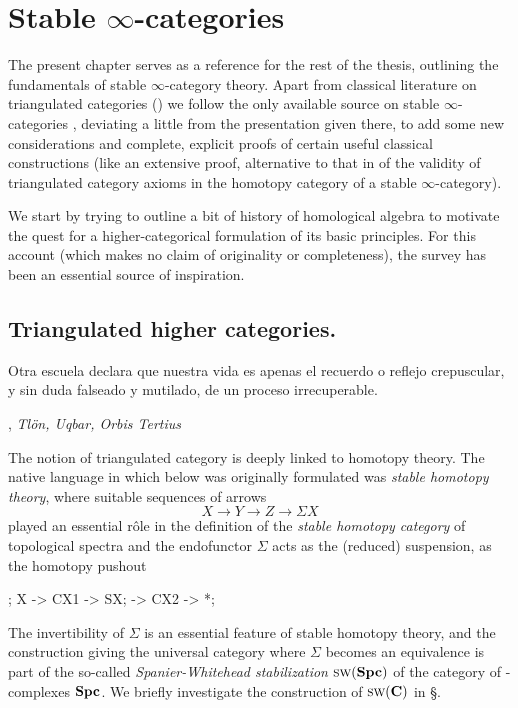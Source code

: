 \chapter{Stable $\infty$\hyp{}categories}\label{chap:stable.cats}
\thispagestyle{empty}
The present chapter serves as a reference for the rest of the thesis, outlining the fundamentals of stable $\infty$\hyp{}category theory. Apart from classical literature on triangulated categories (\cite{Hol,Nee}) we follow the only available source on stable $\infty$\hyp{}categories \cite{LurieHA}, deviating a little from the presentation given there, to add some new considerations and complete, explicit proofs of certain useful classical constructions (like an extensive proof, alternative to that in \cite{LurieHA} of the validity of triangulated category axioms in the homotopy category of a stable $\infty$\hyp{}category).

We start by trying to outline a bit of history of homological algebra to motivate the quest for a higher\hyp{}categorical formulation of its basic principles. For this account (which makes no claim of originality or completeness), the survey \cite{Weibel1997history} has been an essential source of inspiration.
\section{Triangulated higher categories.}
\setlength{\epigraphwidth}{.7\textwidth}
\epigraph{Otra escuela declara \omissis que nuestra vida es apenas el recuerdo o reflejo crepuscular, y sin duda falseado y mutilado, de un proceso irrecuperable.}{\cite{Borges1963}, \emph{Tl\"on, Uqbar, Orbis Tertius}}
\setlength{\epigraphwidth}{\DefaultEpigraphWidth}
The notion of triangulated category is deeply linked to homotopy theory. The native language in which \adef {} below was originally formulated was \emph{stable homotopy theory}, where suitable sequences of arrows
\[\label{dt}
X \to Y\to Z\to \Sigma X
\]
played an essential r\^ole in the definition of the \emph{stable homotopy category} of topological spectra and the endofunctor $\Sigma$ acts as the (reduced) suspension, \ie as the homotopy pushout
\begin{center}
\label{redsusp}
\begin{kD}
;
\mor X -> CX1 -> SX;
\mor * -> CX2 -> *;
\end{kD}
\end{center}
The invertibility of $\Sigma$ is an essential feature of stable homotopy theory, and the construction giving the universal category where $\Sigma$ becomes an equivalence is part of the so\hyp{}called \emph{Spanier\hyp{}Whitehead stabilization} $\text{\scshape sw}(\mathbf{Spc})$ of the category of \hyp{}complexes $\mathbf{Spc}$. We briefly investigate the construction of $\text{\scshape sw}(\mathbf{C})$ in \S{}.

